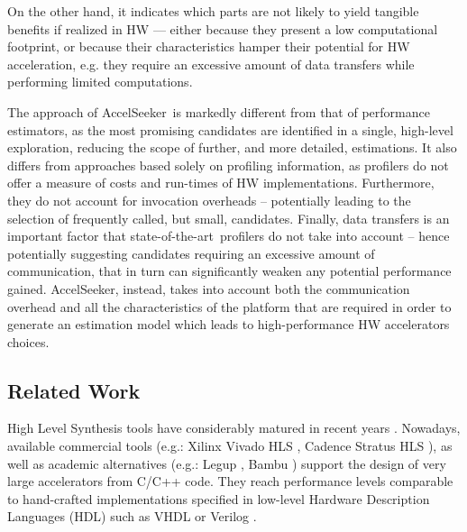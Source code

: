 \documentclass[]{usiinfthesis}
\newcommand{\aseeker}{{AccelSeeker}}
\newcommand{\SoTA}{{state-of-the-art}}
\begin{document}
On the other hand, it indicates which parts are not likely to yield tangible benefits if realized in HW --- either 
because they present a low computational footprint, or because their characteristics hamper their potential for HW 
acceleration, e.g. they require an excessive amount of data transfers while performing limited computations.\par

The approach of \aseeker\ is markedly different from that of performance estimators, as the most promising candidates 
are identified in a single, high-level exploration, reducing the scope of further, and more detailed, estimations. It 
also differs from approaches based solely on profiling information, as profilers do not offer a measure of costs and 
run-times of HW implementations. Furthermore, they do not account for invocation overheads -- potentially leading to the 
selection of frequently called, but small, candidates. Finally, data transfers is an important factor that \SoTA\ profilers
do not take into account -- hence potentially suggesting candidates requiring an excessive amount of communication, that in 
turn can significantly weaken any potential performance gained. \aseeker, instead, takes into account both the communication 
overhead and all the characteristics of the platform that are required in order to generate an estimation model which leads
to high-performance HW accelerators choices.

\subsection{Related Work}

High Level Synthesis tools have considerably matured in recent years \cite{MeeusSep12}. Nowadays, available 
commercial tools (e.g.: Xilinx Vivado HLS \cite{VivadoHLSMar17}, Cadence Stratus HLS \cite{StratusHLSApr16}), 
as well as academic alternatives (e.g.: Legup \cite{CanisSep13}, Bambu \cite{PilatoMar12}) support the design 
of very large accelerators from C/C++ code. They reach performance levels comparable to hand-crafted 
implementations specified in low-level Hardware Description Languages (HDL) such as VHDL or Verilog 
\cite{LiuFeb16}.\par
\end{document}

